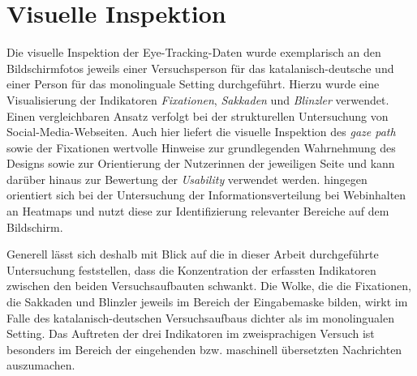 \section{Visuelle Inspektion}
\label{K7:sec:visuelle-inspektion}


Die visuelle Inspektion der Eye-Tracking-Daten wurde exemplarisch an den Bildschirmfotos jeweils einer Versuchsperson für das katalanisch-deutsche und einer Person für das monolinguale Setting durchgeführt. Hierzu wurde eine Visualisierung der Indikatoren \emph{Fixationen}, \emph{Sakkaden} und \emph{Blinzler} verwendet. Einen vergleichbaren Ansatz verfolgt \citet[224\psq]{bergstrom_9_2014} bei der strukturellen Untersuchung von Social-Media-Webseiten. Auch hier liefert die visuelle Inspektion des \emph{gaze path} sowie der Fixationen wertvolle Hinweise zur grundlegenden Wahrnehmung des Designs sowie zur Orientierung der Nutzer{\textperiodcentered}innen der jeweiligen Seite und kann darüber hinaus zur Bewertung der \emph{Usability} verwendet werden. \citet[167\psq]{bergstrom_chapter_2014} hingegen orientiert sich bei der Untersuchung der Informationsverteilung bei Webinhalten an Heatmaps und nutzt diese zur Identifizierung relevanter Bereiche auf dem Bildschirm.

Generell lässt sich deshalb mit Blick auf die in dieser Arbeit durchgeführte Untersuchung feststellen, dass die Konzentration der erfassten Indikatoren zwischen den beiden Versuchsaufbauten schwankt. Die Wolke, die die Fixationen, die Sakkaden und Blinzler jeweils im Bereich der Eingabemaske bilden, wirkt im Falle des katalanisch-deutschen Versuchsaufbaus dichter als im monolingualen Setting. Das Auftreten der drei Indikatoren im zweisprachigen Versuch ist besonders im Bereich der eingehenden bzw. maschinell übersetzten Nachrichten auszumachen.

